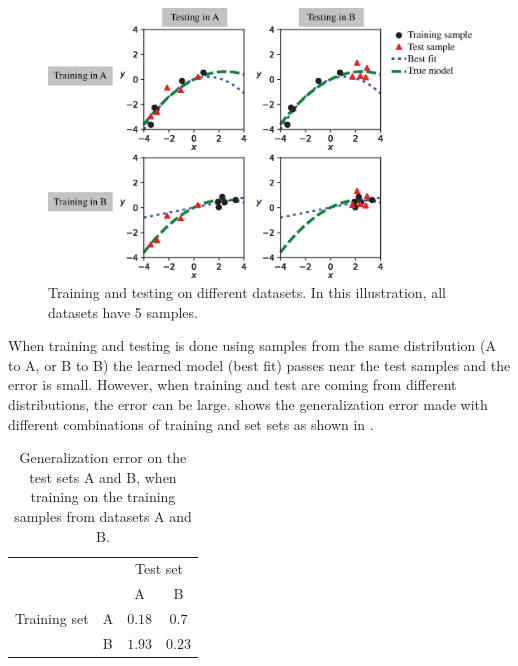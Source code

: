 \begin{figure}[h!]
    \centerline{
    \includegraphics[width=1\linewidth]{figures/bias_and_shift/toy_example/training_test_sets.eps}
    }
    \caption{Training and testing on different datasets. In this illustration, all datasets have 5 samples.}
    \label{fig:bias_and_shift:training_test_sets}
\end{figure}

When training and testing is done using samples from the same distribution (A to A, or B to B) the learned model (best fit) passes near the test samples and the error is small. However, when training and test are coming from different distributions, the error can be large. \Tab{\ref{table:bias_and_shift:training_test_sets}} shows the generalization error made with different combinations of training and set sets as shown in \fig{\ref{fig:bias_and_shift:training_test_sets}}. 
\begin{table}[h]
\caption{Generalization error on the test sets A and B, when training on the training samples from datasets A and B.} 
\label{table:bias_and_shift:training_test_sets}
\begin{center}
\begin{tabular}{l|l|c|c|}
\multicolumn{2}{c}{}&\multicolumn{2}{c}{Test set}\\
\cline{3-4}
\multicolumn{2}{c|}{}&A&B\\
\cline{2-4}
Training set & A & $0.18$ & $0.7$ \\
\cline{2-4}
& B & $1.93$ & $0.23$ \\
\cline{2-4}
\end{tabular}
\end{center}
\end{table}

